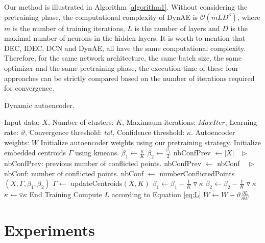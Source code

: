 \documentclass{article}
\begin{document}
Our method is illustrated in Algorithm \ref{algorithm1}. Without considering the pretraining phase, the computational complexity of DynAE is $\mathcal{O}(mLD^{3})$, where $m$ is the number of training iterations, $L$ is the number of layers and $D$ is the maximal number of neurons in the hidden layers. It is worth to mention that DEC, IDEC, DCN and DynAE, all have the same computational complexity. Therefore, for the same network architecture, the same batch size, the same optimizer and the same pretraining phase, the execution time of these four approaches can be strictly compared based on the number of iterations required for convergence.

\begin{algorithm*}
    \caption{Dynamic autoencoder.}
    \label{algorithm1}
\begin{algorithmic}
     Input data: $X$, Number of clusters: $K$, Maximaum iterations: $MaxIter$, Learning rate: $\vartheta $, Convergence threshold: $tol$, Confidence threshold: $\kappa$.
     Autoencoder weights: $W$
    \STATE Initialize autoencoder weights using our pretraining strategy.
    \STATE Initialize embedded centroids $\Gamma$ using kmeans.
    \STATE $\beta_{1} \gets \frac{\kappa}{K}$ 
    \STATE $\beta_{2} \gets \frac{\beta_{1}}{2}$
    \STATE nbConfPrev $ \gets |X|$ $\: \: \triangleright$ nbConfPrev: previous number of conflicted points.
            \STATE nbConfPrev $ \gets $ nbConf $\: \: \:  \triangleright$ nbConf: number of conflicted points.
        \ENDIF
        \STATE nbConf $ \gets$ numberConflictedPoints$(X, \Gamma, \beta_{1}, \beta_{2})$
            \STATE $\Gamma \gets$ updateCentroids$(X, K)$
            \STATE $\beta_{1} \gets \beta_{1} -  \frac{1}{K} \triangledown\kappa$
            \STATE $\beta_{2} \gets \beta_{2} - \frac{1}{K} \triangledown\kappa$
            \STATE $\kappa \gets \triangledown\kappa$
        \ENDIF
            \STATE End Training
        \ENDIF
        \STATE Compute $L$ according to Equation \ref{eq:L} 
        \STATE $W \gets W - \vartheta \frac{\partial L}{\partial W}$
    \ENDFOR
\end{algorithmic}
\end{algorithm*}

\section{Experiments}
\end{document}
